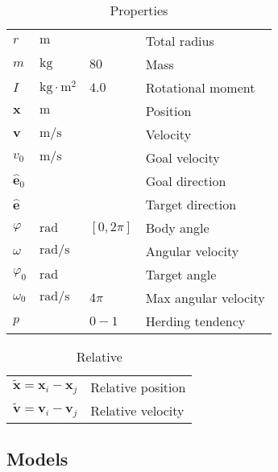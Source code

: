 \begin{table}[H]
\begin{tabularx}{1.0\linewidth}{ l l l l }
\hline
\hline
$ r $                    & $ \mathrm{m} $ &  & Total radius \\
$ m $                    & $ \mathrm{kg} $ & $ 80 $ & Mass \\
$ I $                    & $ \mathrm{kg \cdot m^{2}} $ & $ 4.0 $ & Rotational moment \\
\hline
\hline
$ \mathbf{x} $           & $ \mathrm{m} $ &  & Position \\
$ \mathbf{v} $           & $ \mathrm{m} / \mathrm{s} $ &  & Velocity \\
$ v_{0} $                & $ \mathrm{m} / \mathrm{s} $ &  & Goal velocity \\  
$ \hat{\mathbf{e}}_{0} $ &  &  & Goal direction \\
$ \hat{\mathbf{e}} $     &  &  & Target direction \\
\hline
\hline
$ \varphi $              & $ \mathrm{rad} $ & $ [0, 2 \pi] $ & Body angle \\
$ \omega $               & $ \mathrm{rad} / \mathrm{s} $ &  & Angular velocity \\
$ \varphi_{0} $          & $ \mathrm{rad} $ &  & Target angle \\
$ \omega_{0} $           & $ \mathrm{rad} / \mathrm{s} $ & $ 4\pi $ & Max angular velocity \\
\hline
\hline
$ p $                    &  & $ 0 - 1 $ & Herding tendency \\
\hline
\hline
\end{tabularx}
\caption{Properties}
\end{table}


\begin{table}[H]
\begin{tabularx}{1.0\linewidth}{ll}
\hline
\hline
$ \tilde{\mathbf{x}} = \mathbf{x}_{i} - \mathbf{x}_{j} $ & Relative position \\
$ \tilde{\mathbf{v}} = \mathbf{v}_{i} - \mathbf{v}_{j} $ & Relative velocity \\
\hline
\hline
\end{tabularx}
\caption{Relative}
\end{table}


\subsection{Models}
